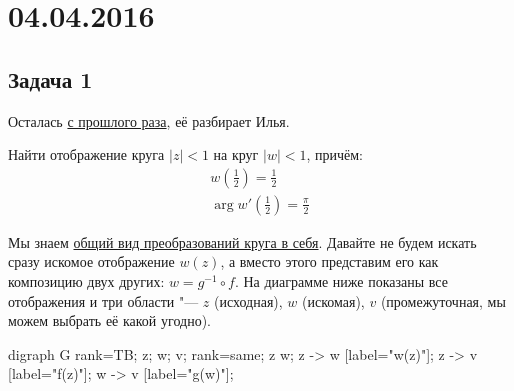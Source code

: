 \chapter{04.04.2016}

\section{Задача 1}\label{day160404_task1}
	Осталась \hyperref[day160331_task1]{с прошлого раза}, её разбирает Илья.

	Найти отображение круга $|z|<1$ на круг $|w|<1$, причём:
	\begin{gather*}
		w\left(\frac 12\right) = \frac12 \\
		\arg w'\left(\frac 12\right) = \frac \pi 2
	\end{gather*}

	Мы знаем \hyperref[day160331_circle_auto]{общий вид преобразований круга в себя}.
	Давайте не будем искать сразу искомое отображение $w(z)$, а вместо этого представим его как композицию двух других: $w = g^{-1} \circ f$.
	На диаграмме ниже показаны все отображения и три области "--- $z$ (исходная), $w$ (искомая), $v$ (промежуточная, мы можем выбрать её какой угодно).
	\begin{center}
		\begin{dot2tex}[options=-tmath]
			digraph G {
				rank=TB;
				z; w; v;
				{rank=same; z w};
				z -> w [label="w(z)"];
				z -> v [label="f(z)"];
				w -> v [label="g(w)"];
			}
		\end{dot2tex}
	\end{center}


